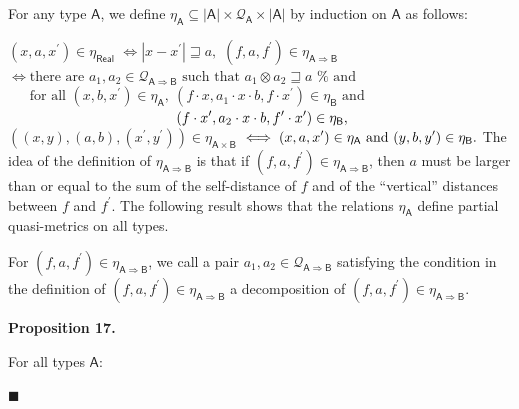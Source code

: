 For any type $\mathsf{A}$, we define $\eta_{\mathsf{A}}\subseteq|\mathsf{A}|\times\mathcal{Q}_{\mathsf{A}}\times|%
\mathsf{A}|$ by induction on $\mathsf{A}$ as follows:\par
    $\displaystyle(x,a,x^{\prime})\in\eta_{\mathsf{Real}}$ $\displaystyle\iff|x-x^{\prime}|\sqsupseteq a,$     $\displaystyle(f,a,f^{\prime})\in\eta_{\mathsf{A}\Rightarrow\mathsf{B}}$ $\displaystyle\iff\text{there are }a_{1},a_{2}\in\mathcal{Q}_{\mathsf{A}%
\Rightarrow\mathsf{B}}\text{ such that }a_{1}\otimes a_{2}\sqsupseteq a\text{ %
and }$      $\displaystyle\phantom{{}\iff{}}\text{for all }(x,b,x^{\prime})\in\eta_{\mathsf%
{A}},\ (f\cdot x,a_{1}\cdot x\cdot b,f\cdot x^{\prime})\in\eta_{\mathsf{B}}%
\text{ and }$      $\displaystyle\phantom{{}\iff{}\text{for all }(x,b,x^{\prime})\in\eta_{\mathsf{%
A}}\ }(f\cdot x^{\prime},a_{2}\cdot x\cdot b,f^{\prime}\cdot x^{\prime})\in%
\eta_{\mathsf{B}},$     $\displaystyle((x,y),(a,b),(x^{\prime},y^{\prime}))\in\eta_{\mathsf{A}\times%
\mathsf{B}}$ $\displaystyle\iff(x,a,x^{\prime})\in\eta_{\mathsf{A}}\text{ and }(y,b,y^{%
\prime})\in\eta_{\mathsf{B}}.$    
The idea of the definition of $\eta_{\mathsf{A}\Rightarrow\mathsf{B}}$ is that if $(f,a,f^{\prime})\in\eta_{\mathsf{A}\Rightarrow\mathsf{B}}$, then $a$ must be larger than or equal to the sum of the self-distance of $f$ and of the “vertical” distances between $f$ and $f^{\prime}$. The following result shows that the relations $\eta_{\mathsf{A}}$ define partial quasi-metrics on all types.\par
 
 
 
For $(f,a,f^{\prime})\in\eta_{\mathsf{A}\Rightarrow\mathsf{B}}$, we call a pair $a_{1},a_{2}\in\mathcal{Q}_{\mathsf{A}\Rightarrow\mathsf{B}}$ satisfying the condition in the definition of $(f,a,f^{\prime})\in\eta_{\mathsf{A}\Rightarrow\mathsf{B}}$ a decomposition of $(f,a,f^{\prime})\in\eta_{\mathsf{A}\Rightarrow\mathsf{B}}$.\par
 
 
 
\par\medskip\noindent\textbf{Proposition 17.}\par
 
 
For all types $\mathsf{A}$:\par
  
\par\noindent  $\blacksquare$ 
 
